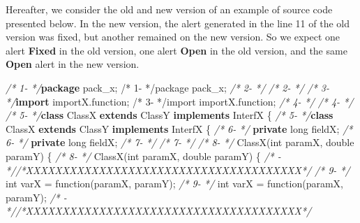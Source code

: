 \documentclass[
]{article}
\newenvironment{Shaded}{\begin{snugshade}}{\end{snugshade}}
\newcommand{\CommentTok}[1]{\textcolor[rgb]{0.56,0.35,0.01}{\textit{#1}}}
\newcommand{\DataTypeTok}[1]{\textcolor[rgb]{0.13,0.29,0.53}{#1}}
\newcommand{\FunctionTok}[1]{\textcolor[rgb]{0.00,0.00,0.00}{#1}}
\newcommand{\ImportTok}[1]{#1}
\newcommand{\KeywordTok}[1]{\textcolor[rgb]{0.13,0.29,0.53}{\textbf{#1}}}
\newcommand{\NormalTok}[1]{#1}
\begin{document}
Hereafter, we consider the old and new version of an example of source
code presented below. In the new version, the alert generated in the
line 11 of the old version was fixed, but another remained on the new
version. So we expect one alert \textbf{Fixed} in the old version, one
alert \textbf{Open} in the old version, and the same \textbf{Open} alert
in the new version.

\vspace{12px}
\scriptsize
\begin{Shaded}
\begin{Highlighting}[]
\CommentTok{/*  1{-}   */}\KeywordTok{package}\ImportTok{ pack\_x;                                          /*  1{-}   */package pack\_x;}                                          
\CommentTok{/*  2{-}   */}                                                         \CommentTok{/*  2{-}   */}                                                         
\CommentTok{/*  3{-}   */}\KeywordTok{import}\ImportTok{ importX.function;                                 /*  3{-}   */import importX.function;}                                 
\CommentTok{/*  4{-}   */}                                                         \CommentTok{/*  4{-}   */}                                                         
\CommentTok{/*  5{-}   */}\KeywordTok{class}\NormalTok{ ClassX }\KeywordTok{extends}\NormalTok{ ClassY }\KeywordTok{implements}\NormalTok{ InterfX \{         }\CommentTok{/*  5{-}   */}\KeywordTok{class}\NormalTok{ ClassX }\KeywordTok{extends}\NormalTok{ ClassY }\KeywordTok{implements}\NormalTok{ InterfX \{         }
\CommentTok{/*  6{-}   */}    \KeywordTok{private} \DataTypeTok{long}\NormalTok{ fieldX;                                 }\CommentTok{/*  6{-}   */}    \KeywordTok{private} \DataTypeTok{long}\NormalTok{ fieldX;                                 }
\CommentTok{/*  7{-}   */}                                                         \CommentTok{/*  7{-}   */}                                                         
\CommentTok{/*  8{-}   */}    \FunctionTok{ClassX}\NormalTok{(}\DataTypeTok{int}\NormalTok{ paramX, }\DataTypeTok{double}\NormalTok{ paramY) \{                  }\CommentTok{/*  8{-}   */}    \FunctionTok{ClassX}\NormalTok{(}\DataTypeTok{int}\NormalTok{ paramX, }\DataTypeTok{double}\NormalTok{ paramY) \{                  }
\CommentTok{/*   {-}   *//*XXXXXXXXXXXXXXXXXXXXXXXXXXXXXXXXXXXXXX*/}               \CommentTok{/*  9{-}   */}        \DataTypeTok{int}\NormalTok{ varX = }\FunctionTok{function}\NormalTok{(paramX, paramY);                  }
\CommentTok{/*  9{-}   */}        \DataTypeTok{int}\NormalTok{ varX = }\FunctionTok{function}\NormalTok{(paramX, paramY);             }\CommentTok{/*   {-}   *//*XXXXXXXXXXXXXXXXXXXXXXXXXXXXXXXXXXXXXX*/}               

\end{Highlighting}
\end{Shaded}
\end{document}
